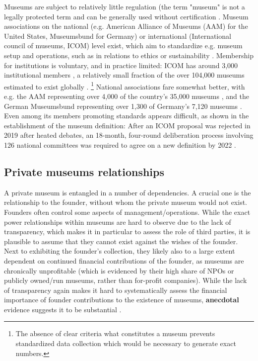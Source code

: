 \documentclass[12pt]{article}
\begin{document}
Museums are subject to relatively little regulation (the term "museum" is not a legally protected term and can be generally used without certification \parencite{Museumsbund_ICOMDE_2006_standards,Moore_2022_best,Lister_2023_marketing}.
Museum associations on the national (e.g. American Alliance of Museums (AAM) for the United States, Museumsbund for Germany) or international (International council of museums, ICOM) level exist, which aim to standardize e.g. museum setup and operations, such as in relations to ethics \parencite{ICOM_2016_ethics} or sustainability \parencite{Bickersteth_2016_environment}. 
Membership for institutions is voluntary, and in practice limited:
ICOM has around 3,000 institutional members \parencite{ICOM_2020_report19}, a relatively small fraction of the over 104,000 museums estimated to exist globally \parencite{UNESCO_2021_covid}. \footnote{The absence of clear criteria what constitutes a museum prevents standardized data collection which would be necessary to generate exact numbers.}
National associations fare somewhat better, with e.g. the AAM representing over 4,000 of the country's 35,000 museums \parencite{LOC_2019_AAM}, and the German Museumsbund representing over 1,300 \parencite{Museumsbund_2024_mitgliedmuseen} of Germany's 7,120 museums \parencite{IMF_2024_museumsstatistik}.
Even among its members promoting standards appears difficult, as shown in the establishment of the museum definition:
After an ICOM proposal was rejected in 2019 after heated debates, an 18-month, four-round deliberation process involving 126 national committees was required to agree on a new definition by 2022 \parencite{Robinson_2021_debating,Seymour_2022_definition}.




\subsection*{Private museums relationships}

A private museum is entangled in a number of dependencies.
A crucial one is the relationship to the founder, without whom the private museum would not exist.
Founders often control some aspects of management/operations.
While the exact power relationships within museums are hard to observe due to the lack of transparency, which makes it in particular to assess the role of third parties, it is plausible to assume that they cannot exist against the wishes of the founder.
Next to exhibiting the founder's collection, they likely also to a large extent dependent on continued financial contributions of the founder, as museums are chronically unprofitable (which is evidenced by their high share of NPOs or publicly owned/run museums, rather than for-profit companies). 
While the lack of transparency again makes it hard to systematically assess the financial importance of founder contributions to the existence of museums, \textbf{anecdotal} evidence suggests it to be substantial \parencite{Velthuis_Gera_forthcoming_fragility}.
\end{document}
